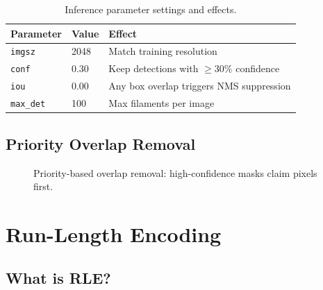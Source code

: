 \documentclass[12pt,a4paper,openany]{report}
\begin{document}
\begin{table}[H]
\centering
\caption{Inference parameter settings and effects.}
\renewcommand{\arraystretch}{1.3}
\begin{tabular}{l l p{7.5cm}}
\toprule
\textbf{Parameter} & \textbf{Value} & \textbf{Effect} \\
\midrule
\texttt{imgsz}    & 2048 & Match training resolution \\
\texttt{conf}     & 0.30 & Keep detections with $\geq30\%$ confidence \\
\texttt{iou}      & 0.00 & Any box overlap triggers NMS suppression \\
\texttt{max\_det} & 100  & Max filaments per image \\
\bottomrule
\end{tabular}
\label{tab:infer_params}
\end{table}

\section{Priority Overlap Removal}

\begin{figure}[H]
\centering
{}
\caption{Priority-based overlap removal: high-confidence masks claim pixels first.}
\label{fig:overlap_flow}
\end{figure}

\chapter{Run-Length Encoding}

\section{What is RLE?}
\end{document}
